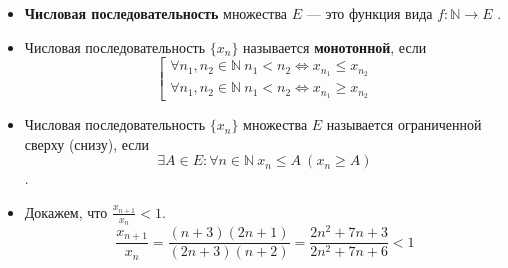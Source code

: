 \documentclass{article}
\begin{document}
\section{\centering}
\noindent{}
\begin{itemize}
    \item
    \textbf{Числовая последовательность} множества \(E\) --- это функция вида \(f: \mathbb{N} \to E\) .
    \item Числовая последовательность \(\{x_n\}\)  называется \textbf{монотонной}, если
    \[
        \left[
            \begin{gathered}
                \forall n_1, n_2 \in \mathbb{N}\ n_1 < n_2 \iff  x_{n_1} \leq x_{n_2}\\
                \forall n_1, n_2 \in \mathbb{N}\ n_1 < n_2 \iff  x_{n_1} \geq x_{n_2}
            \end{gathered}
        \right.
    \]
    \item Числовая последовательность \(\{x_n\}\) множества \(E\)  называется ограниченной сверху (снизу), если 
    \[
        \exists A \in E: \forall n \in \mathbb{N}\ x_n \leq A\ (x_n \geq A)
    \].
    \item Докажем, что \(\displaystyle \frac{x_{n + 1}}{x_{n}} < 1\).
    \[
        \frac{x_{n + 1}}{x_{n}} = \frac{(n + 3)(2n + 1)}{(2n + 3)(n + 2)} = \frac{2n^2 + 7n + 3}{2n^2 + 7n + 6} < 1
    \]
\end{itemize}

\end{document}
